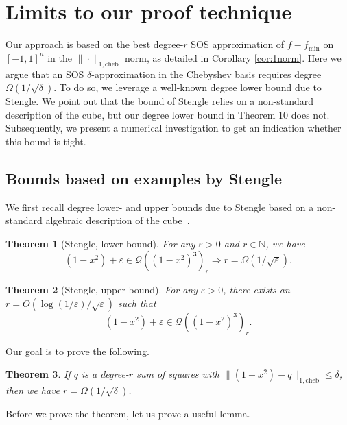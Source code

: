 \documentclass[11pt]{article}
\newcommand{\N}{\mathbb{N}}
\renewcommand{\min}{\mathrm{min}}
\renewcommand{\epsilon}{\varepsilon}
\newcommand{\eps}{\epsilon}
\newtheorem{theorem}{Theorem}
\theoremstyle{definition}
\newcommand{\cheb}{{1,\mathrm{cheb}}}
\newcommand{\SG}[1]{\textcolor{orange}{[SG: #1]}}
\begin{document}
\section{Limits to our proof technique}
\label{sec:limits}

Our approach is based on the best degree-$r$ SOS approximation of  $f- f_\min$ on $[-1,1]^n$ in the $\|\cdot\|_\cheb$ norm, as detailed in Corollary \ref{cor:1norm}.
 Here we argue that
an SOS $\delta$-approximation in the Chebyshev basis requires degree $\Omega(1/\sqrt{\delta})$.
{To do so, we leverage a well-known degree lower bound due to Stengle. We point out that the bound of Stengle relies on a non-standard description of the cube, but our degree lower bound in Theorem 10 does not.}
 Subsequently, we present a numerical investigation to get an indication whether this bound is tight.



\subsection{Bounds based on examples by Stengle}
We first recall degree lower- and upper bounds due to Stengle  %
based on a non-standard algebraic description of the cube~\cite{STENGLE1996167}.



\begin{theorem}[Stengle, lower bound] \label{thrm:stenglelb}
    For any $\eps>0$ and $r \in \N$, we have
    \[
    (1-x^2) + \eps \in \mathcal Q((1-x^2)^3)_r \Rightarrow r = \Omega(1/\sqrt{\eps}).
    \]
\end{theorem}

\begin{theorem}[Stengle, upper bound] \label{thrm:stengleub}
    For any $\eps>0$, there exists an $r = O(\log(1/\eps)/\sqrt{\eps})$ such that
    \[
    (1-x^2) + \eps \in \mathcal Q((1-x^2)^3)_r.
    \]
\end{theorem}

Our goal is to prove the following.



\begin{theorem} \label{thrm:LBcheb}
If $q$ is a degree-$r$ sum of squares with $\|(1-x^2)-q\|_\cheb \leq \delta$, then we have $r = \Omega(1/\sqrt{\delta})$.
\end{theorem}


Before we prove the theorem, let us prove a useful lemma.
\end{document}
